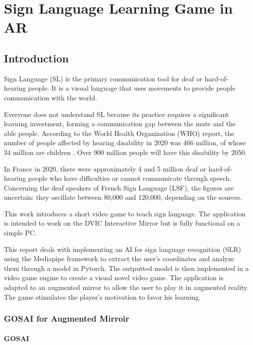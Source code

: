\chapter{Sign Language Learning Game in AR}

\section{Introduction}

Sign Language (SL) is the primary communication tool for deaf or hard-of-hearing people. It is a visual language that uses movements to provide people communication with the world. 

Everyone does not understand SL because its practice requires a significant learning investment, forming a communication gap between the mute and the able people. According to the World Health Organization (WHO) report, the number of people affected by hearing disability in 2020 was 466 million, of whose 34 million are children \cite{el2020sign}. Over 900 million people will have this disability by 2050.

In France in 2020, there were approximately 4 and 5 million deaf or hard-of-hearing people who have difficulties or cannot communicate through speech. Concerning the deaf speakers of French Sign Language (LSF), the figures are uncertain: they oscillate between 80,000 and 120,000, depending on the sources.

This work introduces a short video game to teach sign language. The application is intended to work on the DVIC Interactive Mirror but is fully functional on a simple PC.

This report deals with implementing an AI for sign language recognition (SLR) using the Mediapipe framework to extract the user's coordinates and analyze them through a model in Pytorch. The outputted model is then implemented in a video game engine to create a visual novel video game. The application is adapted to an augmented mirror to allow the user to play it in augmented reality. The game stimulates the player's motivation to favor his learning.

\subsection{GOSAI for Augmented Mirroir}

\subsubsection{GOSAI}

